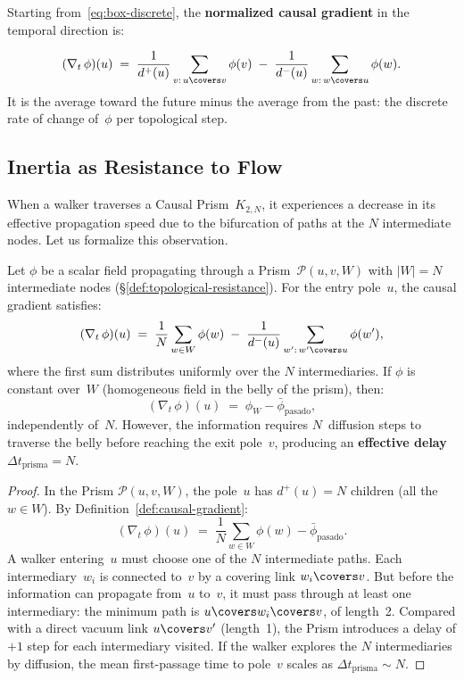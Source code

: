 \noindent
Starting from~\eqref{eq:box-discrete}, the \textbf{normalized causal
gradient} in the temporal direction is:

\begin{definition}
\label{def:causal-gradient}
\begin{equation}
  (\nabla_t\,\phi)(u)
  \;=\;
  \frac{1}{d^+(u)}\sum_{v :\, u \covers v} \phi(v)
  \;-\;
  \frac{1}{d^-(u)}\sum_{w :\, w \covers u} \phi(w).
  \label{eq:causal-gradient}
\end{equation}
It is the average toward the future minus the average from the past: the
discrete rate of change of~$\phi$ per topological step.
\end{definition}

\subsection{Inertia as Resistance to Flow}

When a walker traverses a Causal Prism~$K_{2,N}$, it experiences
a decrease in its effective propagation speed due to the
bifurcation of paths at the $N$ intermediate nodes. Let us formalize
this observation.

\begin{theorem}
\label{thm:gradient-delay}
Let $\phi$ be a scalar field propagating through a
Prism~$\mathcal{P}(u,v,W)$ with $|W| = N$ intermediate nodes
(\S\ref{def:topological-resistance}). For the entry
pole~$u$, the causal gradient satisfies:
\begin{equation}
  (\nabla_t\,\phi)(u)
  \;=\;
  \frac{1}{N}\sum_{w \in W} \phi(w)
  \;-\;
  \frac{1}{d^-(u)}\sum_{w' :\, w' \covers u} \phi(w'),
  \label{eq:gradient-prism}
\end{equation}
where the first sum distributes uniformly over the $N$
intermediaries. If $\phi$ is constant over~$W$ (homogeneous field in
the belly of the prism), then:
\[
  (\nabla_t\,\phi)(u)
  \;=\; \phi_W - \bar{\phi}_{\text{pasado}},
\]
independently of~$N$. However, the information requires
$N$~diffusion steps to traverse the belly before reaching the
exit pole~$v$, producing an \textbf{effective delay}
$\Delta t_{\text{prisma}} = N$.
\end{theorem}

\begin{proof}
In the Prism $\mathcal{P}(u,v,W)$, the pole~$u$ has $d^+(u) = N$
children (all the $w \in W$). By
Definition~\ref{def:causal-gradient}:
\[
  (\nabla_t\,\phi)(u)
  \;=\;
  \frac{1}{N}\sum_{w \in W}\phi(w) - \bar{\phi}_{\text{pasado}}.
\]
A walker entering~$u$ must choose one of the $N$ intermediate
paths. Each intermediary~$w_i$ is connected to~$v$ by a
covering link $w_i \covers v$. But before the
information can propagate from~$u$ to~$v$, it must pass through at
least one intermediary: the minimum path is
$u \covers w_i \covers v$, of length~2. Compared with a
direct vacuum link $u \covers v'$ (length~1), the
Prism introduces a delay of $+1$ step for each intermediary
visited. If the walker explores the $N$ intermediaries by diffusion,
the mean first-passage time to pole~$v$ scales as $\Delta
t_{\text{prisma}} \sim N$.
\end{proof}

